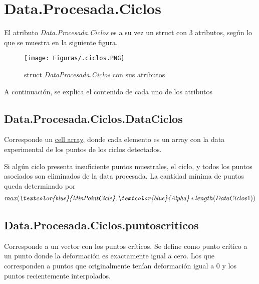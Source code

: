 \documentclass[a4paper, 11pt,article,oneside]{memoir}%
\begin{document}
\chapter{Data.Procesada.Ciclos}
El atributo \textit{Data.Procesada.Ciclos} es a su vez un struct con 3 atributos, según lo que se muestra en la siguiente figura.\\

\begin{figure}[H]
    \centering
    \texttt{[image: Figuras/.ciclos.PNG]}
    \caption{struct \textit{DataProcesada.Ciclos} con sus atributos}
    \label{fig:first resumen e2 }
\end{figure}

A continuación, se explica el contenido de cada uno de los atributos 
\section{Data.Procesada.Ciclos.DataCiclos}
Corresponde un \href{https://www.mathworks.com/help/matlab/cell-arrays.html}{cell array}, donde cada elemento es un array con la data experimental de los puntos de los ciclos detectados.\par 
Si algún ciclo presenta insuficiente puntos muestrales, el ciclo, y todos los puntos asociados son eliminados de la data procesada. La cantidad mínima de puntos queda determinado por 
\begin{align*}
max(\textit{\textcolor{blue}{MinPointCicle}},\textit{\textcolor{blue}{Alpha}} *length(DataCiclos{1}))
\end{align*}

\section{Data.Procesada.Ciclos.puntoscriticos}
Corresponde a un vector con los puntos críticos. Se define como punto crítico a un punto donde la deformación es exactamente igual a cero. Los que corresponden a puntos que originalmente tenían deformación igual a 0 y los puntos recientemente interpolados. 
\end{document}
